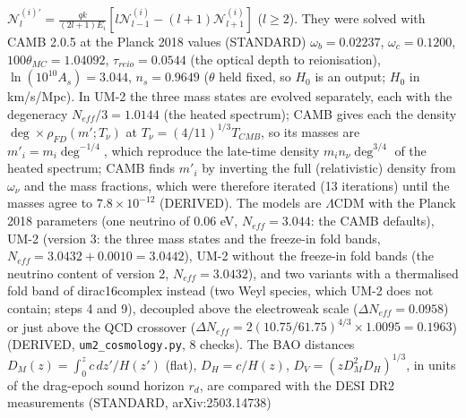 \documentclass[
  10pt,
]{article}
\begin{document}
\(\mathcal N^{(i)\prime}_l = \frac{qk}{(2l+1)E_i}[l\mathcal N^{(i)}_{l-1} - (l+1)\mathcal N^{(i)}_{l+1}]\)
(\(l \ge 2\)). They were solved with CAMB 2.0.5 at the Planck 2018
values (STANDARD) \(\omega_b = 0.02237\), \(\omega_c = 0.1200\),
\(100\theta_{MC} = 1.04092\), \(\tau_{reio} = 0.0544\) (the optical
depth to reionisation), \(\ln(10^{10}A_s) = 3.044\), \(n_s = 0.9649\)
(\(\theta\) held fixed, so \(H_0\) is an output; \(H_0\) in km/s/Mpc).
In UM-2 the three mass states are evolved separately, each with the
degeneracy \(N_{eff}/3 = 1.0144\) (the heated spectrum); CAMB gives each
the density \(\deg\times\rho_{FD}(m'; T_\nu)\) at
\(T_\nu = (4/11)^{1/3}T_{CMB}\), so its masses are
\(m'_i = m_i\deg^{-1/4}\), which reproduce the late-time density
\(m_in_\nu\deg^{3/4}\) of the heated spectrum; CAMB finds \(m'_i\) by
inverting the full (relativistic) density from \(\omega_\nu\) and the
mass fractions, which were therefore iterated (13 iterations) until the
masses agree to \(7.8\times10^{-12}\) (DERIVED). The models are
\(\Lambda\)CDM with the Planck 2018 parameters (one neutrino of \(0.06\)
eV, \(N_{eff} = 3.044\): the CAMB defaults), UM-2 (version 3: the three
mass states and the freeze-in fold bands,
\(N_{eff} = 3.0432 + 0.0010 = 3.0442\)), UM-2 without the freeze-in fold
bands (the neutrino content of version 2, \(N_{eff} = 3.0432\)), and two
variants with a thermalised fold band of dirac16complex instead (two
Weyl species, which UM-2 does not contain; steps 4 and 9), decoupled
above the electroweak scale (\(\Delta N_{eff} = 0.0958\)) or just above
the QCD crossover
(\(\Delta N_{eff} = 2(10.75/61.75)^{4/3}\times1.0095 = 0.1963\))
(DERIVED, \texttt{um2\_cosmology.py}, 8 checks). The BAO distances
\(D_M(z) = \int_0^z c\,dz'/H(z')\) (flat), \(D_H = c/H(z)\),
\(D_V = (zD_M^2D_H)^{1/3}\), in units of the drag-epoch sound horizon
\(r_d\), are compared with the DESI DR2 measurements (STANDARD,
arXiv:2503.14738)
\end{document}
